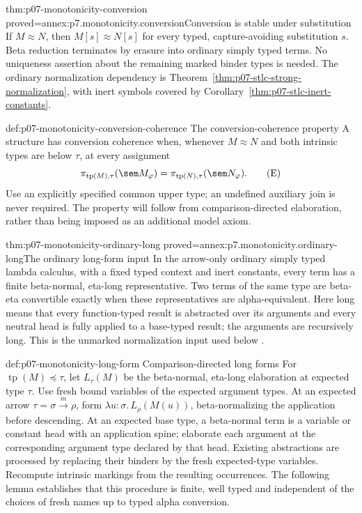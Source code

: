 \begin{hblemma}{thm:p07-monotonicity-conversion}
 {proved=annex:p7.monotonicity.conversion}{Conversion is stable under substitution}
If \(M\approx N\), then \(M[s]\approx N[s]\) for every typed,
capture-avoiding substitution \(s\).
Beta reduction terminates by erasure into ordinary simply typed terms.
No uniqueness assertion about the remaining marked binder types is needed.
The ordinary normalization dependency is
Theorem~\ref{thm:p07-stlc-strong-normalization}, with inert symbols covered by
Corollary~\ref{thm:p07-stlc-inert-constants}.
\end{hblemma}

\begin{hbdefinition}{def:p07-monotonicity-conversion-coherence}
 {The conversion-coherence property}
A structure has conversion coherence when, whenever \(M\approx N\)
and both intrinsic types
are below \(\tau\), at every assignment
\[
 \pi_{\operatorname{tp}(M),\tau}(\sem M_\varphi)
 =
 \pi_{\operatorname{tp}(N),\tau}(\sem N_\varphi).
 \tag{E}
\]
Use an explicitly specified common upper type; an undefined auxiliary
join is never required. The property will follow from comparison-directed
elaboration, rather than being imposed as an additional model axiom.
\end{hbdefinition}

\begin{hblemma}{thm:p07-monotonicity-ordinary-long}
 {proved=annex:p7.monotonicity.ordinary-long}{The ordinary long-form input}
In the arrow-only ordinary simply typed lambda calculus, with a fixed
typed context and inert constants, every term has a finite beta-normal,
eta-long representative. Two terms of the same type are beta-eta
convertible exactly when these representatives are alpha-equivalent.
Here long means that every function-typed result is abstracted over its
arguments and every neutral head is fully applied to a base-typed result;
the arguments are recursively long.
This is the unmarked normalization input used below
\cite[Sections 4.2--4.4 and 8.7]{Selinger2013LambdaNotesV2}.
\end{hblemma}

\begin{hbdefinition}{def:p07-monotonicity-long-form}
 {Comparison-directed long forms}
For \(\operatorname{tp}(M)\preceq\tau\), let \(L_\tau(M)\) be the
beta-normal, eta-long elaboration at expected type \(\tau\).
Use fresh bound variables of the expected argument types.
At an expected arrow \(\tau=\sigma\xrightarrow m\rho\), form
\(\lambda u:\sigma.\,L_\rho(M(u))\), beta-normalizing the application
before descending. At an expected base type, a beta-normal term is a
variable or constant head with an application spine; elaborate each
argument at the corresponding argument type declared by that head.
Existing abstractions are processed by replacing their binders by the
fresh expected-type variables. Recompute intrinsic markings from the
resulting occurrences. The following lemma establishes that this
procedure is finite, well typed and independent of the choices of fresh
names up to typed alpha conversion.
\end{hbdefinition}

